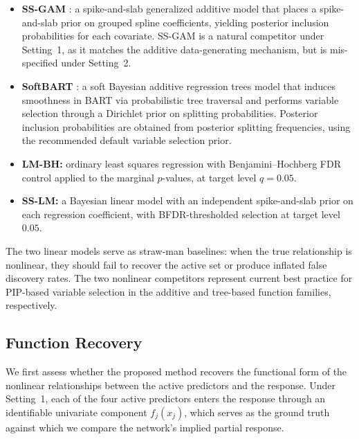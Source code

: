 {\begin{itemize}
  \item \textbf{SS-GAM} {\citep{scheipl_ssgam}}: a
    spike-and-slab generalized additive model that places a
    spike-and-slab prior on grouped spline coefficients, yielding
    posterior inclusion probabilities for each covariate.  SS-GAM is a
    natural competitor under Setting~1, as it matches the additive
    data-generating mechanism, but is mis-specified under Setting~2.
  \item \textbf{SoftBART} \citep{linero_softbart_2022}:
    a soft Bayesian additive regression trees model that induces
    smoothness in BART via probabilistic tree traversal and performs
    variable selection through a Dirichlet prior on splitting
    probabilities.  Posterior inclusion probabilities are obtained
    from posterior splitting frequencies, using the recommended default variable selection prior.
  \item \textbf{LM-BH:} ordinary least squares regression with
    Benjamini--Hochberg FDR control applied
    to the marginal $p$-values, at target level $q = 0.05$.
  \item \textbf{SS-LM:} a Bayesian linear model with an independent
    spike-and-slab prior on each
    regression coefficient, with BFDR-thresholded selection at target
    level $0.05$.
\end{itemize}
The two linear models serve as straw-man baselines: when the true
relationship is nonlinear, they should fail to recover the active
set or produce inflated false discovery
rates.  The two nonlinear competitors represent current best practice
for PIP-based variable selection in the additive and tree-based
function families, respectively.

\subsection{Function Recovery}
\label{subsec:ch3-funcrecov}

We first assess whether the proposed method recovers the functional
form of the nonlinear relationships between the active predictors and
the response.  Under Setting~1, each of the four active predictors enters the
response through an identifiable univariate component $f_j(x_j)$,
which serves as the ground truth against which we compare the
network's implied partial response.


}
